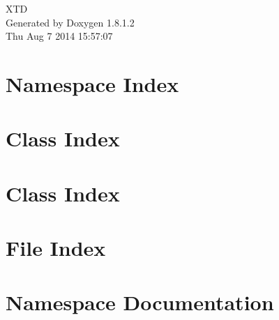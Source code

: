 \documentclass{book}
\begin{document}
\hypersetup{pageanchor=false,citecolor=blue}
\begin{titlepage}
\vspace*{7cm}
\begin{center}
{\Large X\-T\-D }\\
\vspace*{1cm}
{\large Generated by Doxygen 1.8.1.2}\\
\vspace*{0.5cm}
{\small Thu Aug 7 2014 15:57:07}\\
\end{center}
\end{titlepage}
\clearemptydoublepage
{}
\tableofcontents
\clearemptydoublepage
{}
\hypersetup{pageanchor=true,citecolor=blue}
\chapter{Namespace Index}

\chapter{Class Index}

\chapter{Class Index}

\chapter{File Index}

\chapter{Namespace Documentation}








\end{document}
